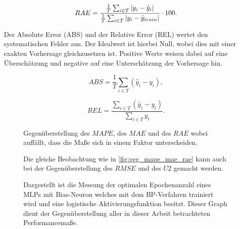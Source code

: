 \begin{equation}
RAE = \frac{\frac{1}{T} \sum_{i \in T} \abs{y_i-\hat{y}_i}}{ \frac{1}{T} \sum_{i \in T} \abs{y_i-\bar{y}_{train}} } \cdot 100 .
\label{gl:RAE}
\end{equation}


Der Absolute Error (ABS) und der Relative Error (REL) wertet den systematischen Fehler aus. Der Idealwert ist hierbei Null, wobei dies mit einer exakten Vorhersage gleichzusetzen ist. Positive Werte weisen dabei auf eine Überschätzung und negative auf eine Unterschätzung der Vorhersage hin.\,

\begin{equation}
ABS= \frac{1}{T} \sum\limits_{i \in T} (\hat{y}_i-y_i),
\label{gl:ABS}
\end{equation}


\begin{equation}
REL= \frac{\sum_{i \in T} (\hat{y}_i-y_i)}{\sum_{i \in T} y_i} .
\label{gl:REL}
\end{equation}



\begin{figure}[!htb]
    \centering
        
    \caption{Gegenüberstellung des $MAPE$, des $MAE$ und des $RAE$ wobei auffällt, dass die Maße sich in einem Faktor unterscheiden.}
    \label{fig:geg_mape_mae_rae}
\end{figure}

\begin{figure}[!htb]
    \centering
        
    \caption{Die gleiche Beobachtung wie in \autoref{fig:geg_mape_mae_rae} kann auch bei der Gegenüberstellung des $RMSE$ und des $U2$ gemacht werden.}
    \label{fig:geg_rmse_u2}
\end{figure}

\begin{landscape}
\begin{figure}[!htb]
    \centering
        
    \caption{Dargestellt ist die Messung der optimalen Epochenanzahl eines MLPs mit Bias-Neuron welches mit dem BP-Verfahren trainiert wird und eine logistische Aktivierungsfunktion besitzt. Dieser Graph dient der Gegenüberstellung aller in dieser Arbeit betrachteten Performancemaße.}
    \label{fig:geg_alle}
\end{figure}
\end{landscape}

